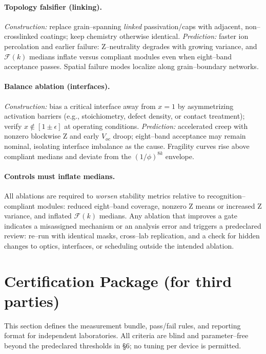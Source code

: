 \documentclass[12pt]{article}
\begin{document}
\paragraph{Topology falsifier (linking).}
\emph{Construction:} replace grain–spanning \emph{linked} passivation/caps with adjacent, non–crosslinked coatings; keep chemistry otherwise identical.  
\emph{Prediction:} faster ion percolation and earlier failure: Z–neutrality degrades with growing variance, and $\mathcal{F}(k)$ medians inflate versus compliant modules even when eight–band acceptance passes. Spatial failure modes localize along grain–boundary networks.

\paragraph{Balance ablation (interfaces).}
\emph{Construction:} bias a critical interface away from $x=1$ by asymmetrizing activation barriers (e.g., stoichiometry, defect density, or contact treatment); verify $x\notin[1\pm\epsilon]$ at operating conditions.  
\emph{Prediction:} accelerated creep with nonzero blockwise Z and early $V_{\!oc}$ droop; eight–band acceptance may remain nominal, isolating interface imbalance as the cause. Fragility curves rise above compliant medians and deviate from the $(1/\phi)^{8k}$ envelope.

\paragraph{Controls must inflate medians.}
All ablations are required to \emph{worsen} stability metrics relative to recognition–compliant modules: reduced eight–band coverage, nonzero Z means or increased Z variance, and inflated $\mathcal{F}(k)$ medians. Any ablation that improves a gate indicates a misassigned mechanism or an analysis error and triggers a predeclared review: re–run with identical masks, cross–lab replication, and a check for hidden changes to optics, interfaces, or scheduling outside the intended ablation.

\section{Certification Package (for third parties)}

This section defines the measurement bundle, pass/fail rules, and reporting format for independent laboratories. All criteria are blind and parameter–free beyond the predeclared thresholds in \S6; no tuning per device is permitted.
\end{document}
